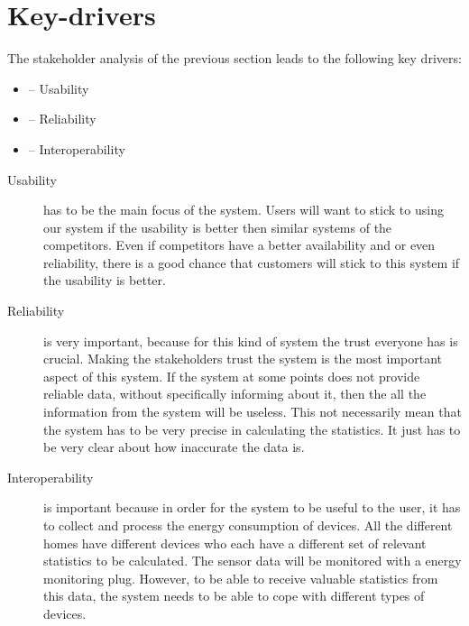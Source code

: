 \section{Key-drivers}
The stakeholder analysis of the previous section leads to the following key drivers:
\begin{itemize}
	\item {}-- Usability
	\item {}-- Reliability
	\item {}-- Interoperability
\end{itemize}


\begin{description}

\item [Usability] has to be the main focus of the system. Users will want to stick to using our system if the usability is better then similar systems of the competitors. Even if competitors have a better availability and or even reliability, there is a good chance that customers will stick to this system if the usability is better. 

\item [Reliability] is very important, because for this kind of system the trust everyone has is crucial. Making the stakeholders trust the system is the most important aspect of this system. If the system at some points does not provide reliable data, without specifically informing about it, then the all the information from the system will be useless.
This not necessarily mean that the system has to be very precise in calculating the statistics. It just has to be very clear about how inaccurate the data is.

\item [Interoperability] is important because in order for the system to be useful to the user, it has to collect and process the energy consumption of devices. All the different homes have different devices who each have a different set of relevant statistics to be calculated.
The sensor data will be monitored with a energy monitoring plug. However, to be able to receive valuable statistics from this data, the system needs to be able to cope with different types of devices.
%

\end{description}
